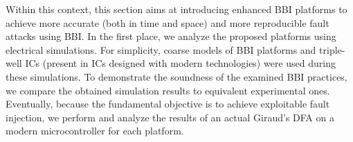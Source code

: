 \documentclass[10pt, conference, compsocconf]{IEEEtran}
\begin{document}
Within this context, this section aims at introducing enhanced BBI platforms to achieve more accurate (both in time and space) and more reproducible fault attacks using BBI.
In the first place, we analyze the proposed platforms using electrical simulations.
For simplicity, coarse models of BBI platforms and triple-well ICs (present in ICs designed with modern technologies) were used during these simulations.
To demonstrate the soundness of the examined BBI practices, we compare the obtained simulation results to equivalent experimental ones.
Eventually, because the fundamental objective is to achieve exploitable fault injection, we perform and analyze the results of an actual Giraud's DFA on a modern microcontroller for each platform.

\end{document}
